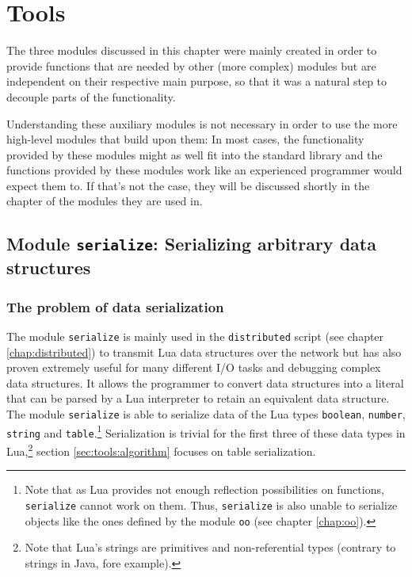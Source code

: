\chapter{Tools}
\label{chap:serialize}
\label{chap:typetools}
\label{chap:nd}

The three modules discussed in this chapter were mainly created in order to provide functions that are needed by other (more complex) modules but are independent on their respective main purpose, so that it was a natural step to decouple parts of the functionality.

Understanding these auxiliary modules is not necessary in order to use the more high-level modules that build upon them: In most cases, the functionality provided by these modules might as well fit into the standard library and the functions provided by these modules work like an experienced programmer would expect them to. If that's not the case, they will be discussed shortly in the chapter of the modules they are used in.

\section{Module \texttt{serialize}: Serializing arbitrary data structures}
\label{sec:tools:serialize}

\subsection{The problem of data serialization}
\label{sec:tools:serialize:problem}

The module \texttt{serialize} is mainly used in the \texttt{distributed} script (see chapter \ref{chap:distributed}) to transmit Lua data structures over the network but has also proven extremely useful for many different I/O tasks and debugging complex data structures. It allows the programmer to convert data structures into a literal that can be parsed by a Lua interpreter to retain an equivalent data structure. The module \texttt{serialize} is able to serialize data of the Lua types \texttt{boolean}, \texttt{number}, \texttt{string} and \texttt{table}.\footnote{Note that as Lua provides not enough reflection possibilities on functions, \texttt{serialize} cannot work on them. Thus, \texttt{serialize} is also unable to serialize objects like the ones defined by the module \texttt{oo} (see chapter \ref{chap:oo}).} Serialization is trivial for the first three of these data types in Lua,\footnote{Note that Lua's strings are primitives and non-referential types (contrary to strings in Java, fore example).} section \ref{sec:tools:algorithm} focuses on table serialization.

